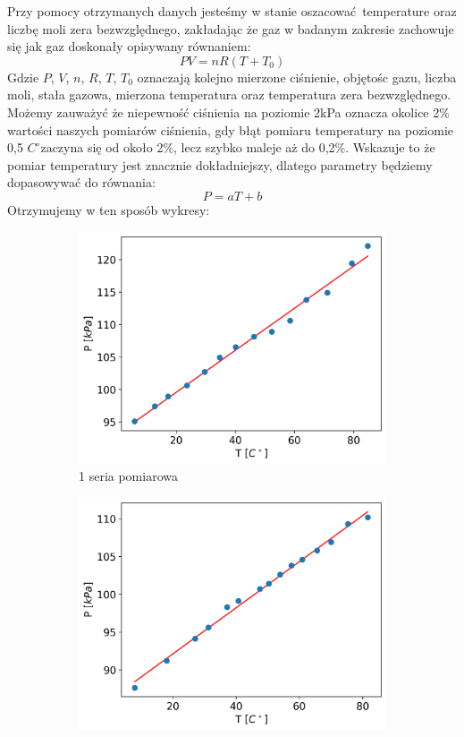 \documentclass[12pt]{article}
\begin{document}
Przy pomocy otrzymanych danych jesteśmy w stanie oszacować temperature oraz liczbę moli zera bezwzględnego, zakładając że gaz w badanym zakresie zachowuje się jak gaz doskonały opisywany równaniem:
\[
    PV = nR(T + T_0)
\]
Gdzie \(P\), \(V\), \(n\), \(R\), \(T\), \(T_0\) oznaczają kolejno mierzone ciśnienie, objętośc gazu, liczba moli, stała gazowa, mierzona temperatura oraz temperatura zera bezwzględnego. Możemy zauważyć że niepewność ciśnienia na poziomie 2kPa oznacza okolice 2\% wartości naszych pomiarów ciśnienia, gdy błąt pomiaru temperatury na poziomie 0{,}5 \(C^\circ\)zaczyna się od około 2\%, lecz szybko maleje aż do 0{,}2\%. Wskazuje to że pomiar temperatury jest znacznie dokładniejszy, dlatego parametry będziemy dopasowywać do równania:
\[
    P = aT + b
\]
Otrzymujemy w ten sposób wykresy:
\begin{figure}[H]
    \centering
    \begin{subfigure}{0.47\textwidth}
        \includegraphics[width=\linewidth]{izohoric_0}
        \caption{1 seria pomiarowa}
    \end{subfigure}\hfill
    \begin{subfigure}{0.47\textwidth}
        \includegraphics[width=\linewidth]{izohoric_1}

\end{subfigure}
\end{figure}
\end{document}
